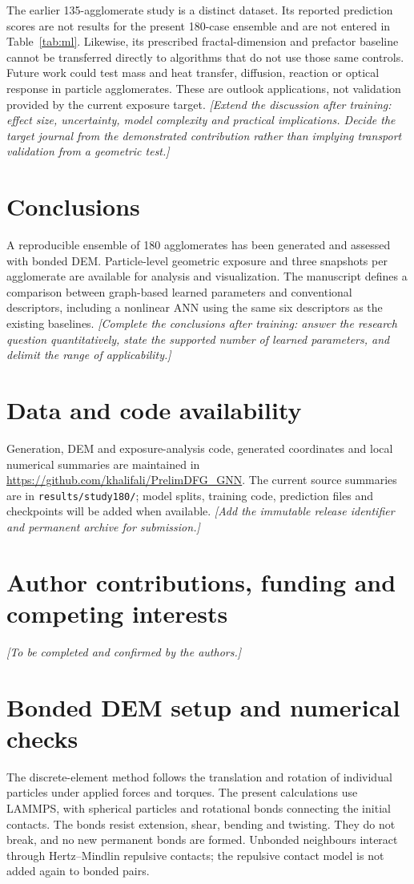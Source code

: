 \documentclass[11pt,a4paper]{article}
\newcommand{\pending}[1]{{\color{red}\textit{[#1]}}}
\begin{document}
The earlier 135-agglomerate study is a distinct dataset. Its reported prediction scores are not results for the present 180-case ensemble and are not entered in Table~\ref{tab:ml}. Likewise, its prescribed fractal-dimension and prefactor baseline cannot be transferred directly to algorithms that do not use those same controls. Future work could test mass and heat transfer, diffusion, reaction or optical response in particle agglomerates. These are outlook applications, not validation provided by the current exposure target. \pending{Extend the discussion after training: effect size, uncertainty, model complexity and practical implications. Decide the target journal from the demonstrated contribution rather than implying transport validation from a geometric test.}

\section{Conclusions}
A reproducible ensemble of 180 agglomerates has been generated and assessed with bonded DEM. Particle-level geometric exposure and three snapshots per agglomerate are available for analysis and visualization. The manuscript defines a comparison between graph-based learned parameters and conventional descriptors, including a nonlinear ANN using the same six descriptors as the existing baselines. \pending{Complete the conclusions after training: answer the research question quantitatively, state the supported number of learned parameters, and delimit the range of applicability.}

\section*{Data and code availability}
Generation, DEM and exposure-analysis code, generated coordinates and local numerical summaries are maintained in \url{https://github.com/khalifali/PrelimDFG_GNN}. The current source summaries are in \texttt{results/study180/}; model splits, training code, prediction files and checkpoints will be added when available. \pending{Add the immutable release identifier and permanent archive for submission.}
\section*{Author contributions, funding and competing interests}
\pending{To be completed and confirmed by the authors.}
\FloatBarrier
\appendix
\section{Bonded DEM setup and numerical checks}\label{app:dem}
The discrete-element method follows the translation and rotation of individual particles under applied forces and torques. The present calculations use LAMMPS, with spherical particles and rotational bonds connecting the initial contacts. The bonds resist extension, shear, bending and twisting. They do not break, and no new permanent bonds are formed. Unbonded neighbours interact through Hertz--Mindlin repulsive contacts; the repulsive contact model is not added again to bonded pairs.
\end{document}
